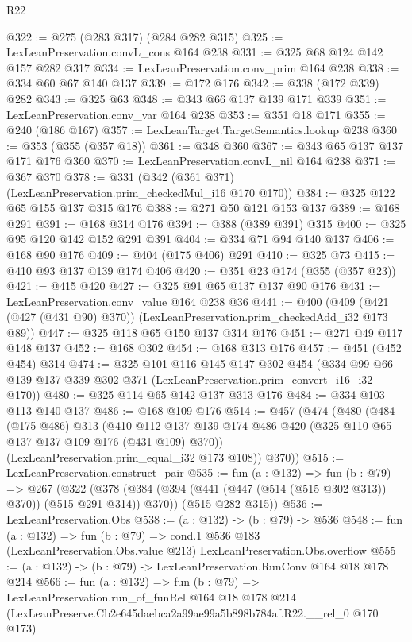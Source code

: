 \begin{lexlean}{R22}
\begin{coremodule}
@322 := @275 (@283 @317) (@284 @282 @315)
@325 := LexLeanPreservation.convL_cons @164 @238
@331 := @325 @68 @124 @142 @157 @282 @317
@334 := LexLeanPreservation.conv_prim @164 @238
@338 := @334 @60 @67 @140 @137
@339 := @172 @176
@342 := @338 (@172 @339) @282
@343 := @325 @63
@348 := @343 @66 @137 @139 @171 @339
@351 := LexLeanPreservation.conv_var @164 @238
@353 := @351 @18 @171
@355 := @240 (@186 @167)
@357 := LexLeanTarget.TargetSemantics.lookup @238
@360 := @353 (@355 (@357 @18))
@361 := @348 @360
@367 := @343 @65 @137 @137 @171 @176 @360
@370 := LexLeanPreservation.convL_nil @164 @238
@371 := @367 @370
@378 := @331 (@342 (@361 @371) (LexLeanPreservation.prim_checkedMul_i16 @170 @170))
@384 := @325 @122 @65 @155 @137 @315 @176
@388 := @271 @50 @121 @153 @137
@389 := @168 @291
@391 := @168 @314 @176
@394 := @388 (@389 @391) @315
@400 := @325 @95 @120 @142 @152 @291 @391
@404 := @334 @71 @94 @140 @137
@406 := @168 @90 @176
@409 := @404 (@175 @406) @291
@410 := @325 @73
@415 := @410 @93 @137 @139 @174 @406
@420 := @351 @23 @174 (@355 (@357 @23))
@421 := @415 @420
@427 := @325 @91 @65 @137 @137 @90 @176
@431 := LexLeanPreservation.conv_value @164 @238 @36
@441 := @400 (@409 (@421 (@427 (@431 @90) @370)) (LexLeanPreservation.prim_checkedAdd_i32 @173 @89))
@447 := @325 @118 @65 @150 @137 @314 @176
@451 := @271 @49 @117 @148 @137
@452 := @168 @302
@454 := @168 @313 @176
@457 := @451 (@452 @454) @314
@474 := @325
    @101
    @116
    @145
    @147
    @302
    @454
    (@334 @99 @66 @139 @137 @339 @302 @371 (LexLeanPreservation.prim_convert_i16_i32 @170))
@480 := @325 @114 @65 @142 @137 @313 @176
@484 := @334 @103 @113 @140 @137
@486 := @168 @109 @176
@514 := @457
    (@474
      (@480
        (@484
          (@175 @486)
          @313
          (@410 @112 @137 @139 @174 @486 @420 (@325 @110 @65 @137 @137 @109 @176 (@431 @109) @370))
          (LexLeanPreservation.prim_equal_i32 @173 @108))
        @370))
@515 := LexLeanPreservation.construct_pair
@535 := fun (a : @132) =>
  fun (b : @79) =>
  @267
    (@322
      (@378 (@384 (@394 (@441 (@447 (@514 (@515 @302 @313)) @370)) (@515 @291 @314)) @370))
      (@515 @282 @315))
@536 := LexLeanPreservation.Obs
@538 := (a : @132) -> (b : @79) -> @536
@548 := fun (a : @132) =>
  fun (b : @79) =>
  cond.{1} @536 @183 (LexLeanPreservation.Obs.value @213) LexLeanPreservation.Obs.overflow
@555 := (a : @132) -> (b : @79) -> LexLeanPreservation.RunConv @164 @18 @178 @214
@566 := fun (a : @132) =>
  fun (b : @79) =>
  LexLeanPreservation.run_of_funRel
    @164
    @18
    @178
    @214
    (LexLeanPreserve.Cb2e645daebca2a99ae99a5b898b784af.R22.__rel_0 @170 @173)
\end{coremodule}
\end{lexlean}
